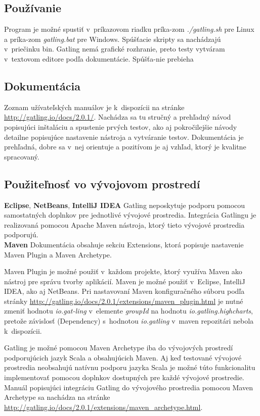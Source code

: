\documentclass[12pt,oneside,final]{fithesis-utf8}
\begin{document}
\subsection{Používanie}
Program je možné spustiť v~príkazovom riadku príka-zom \textit{./gatling.sh} pre Linux a príka-zom \textit{gatling.bat} pre Windows. Spúšťacie skripty sa nachádzajú v~priečinku bin. Gatling nemá grafické rozhranie, preto testy vytváram v~textovom editore podľa dokumentácie. Spúšťa-nie prebieha

\subsection{Dokumentácia}
Zoznam užívateľských manuálov je k~dispozícii na stránke \url{http://gatling.io/docs/2.0.1/}. Nachádza sa tu stručný a prehľadný návod popisujúci inštaláciu a spustenie prvých testov, ako aj pokročilejšie návody detailne popisujúce nastavenie nástroja a vytváranie testov. Dokumentácia je prehľadná, dobre sa v~nej orientuje a pozitívom je aj vzhľad, ktorý je kvalitne spracovaný.


\subsection{Použiteľnosť vo vývojovom prostredí}
\textbf{Eclipse}, \textbf{NetBeans}, \textbf{IntelliJ IDEA}
\newline
Gatling neposkytuje podporu pomocou samostatných doplnkov pre jednotlivé vývojové prostredia. Integrácia Gatlingu je realizovaná pomocou Apache Maven nástroja, ktorý tieto vývojové prostredia podporujú.\\

\noindent \textbf{Maven}
\newline
Dokumentácia obsahuje sekciu Extensions, ktorá popisuje nastavenie Maven Plugin a Maven Archetype.
\par Maven Plugin je možné použiť v~každom projekte, ktorý využíva Maven ako nástroj pre správu tvorby aplikácií. Maven je možné použiť v~Eclipse, IntelliJ IDEA, ako aj NetBeans. Pri nastavovaní Maven konfiguračného súboru podľa stránky \url{http://gatling.io/docs/2.0.1/extensions/maven_plugin.html} je nutné zmeniť hodnotu \textit{io.gat-ling} v~elemente \textit{groupId} na hodnotu \textit{io.gatling.highcharts}, pretože závislosť (Dependency) s~hodnotou \textit{io.gatling} v~maven repozitári nebola k~dispozícii.
\newline
\newline
\par Gatling je možné pomocou Maven Archetype iba do vývojových prostredí podporujúcich jazyk Scala a obsahujúcich Maven. Aj keď testované vývojové prostredia neobsahujú natívnu podporu jazyka Scala je možné túto funkcionalitu implementovať pomocou doplnkov dostupných pre každé vývojové prostredie. Manuál popisujúci integráciu Gatling do vývojového prostredia pomocou Maven Archetype sa nachádza na stránke \url{http://gatling.io/docs/2.0.1/extensions/maven_archetype.html}.
\newline
\end{document}
